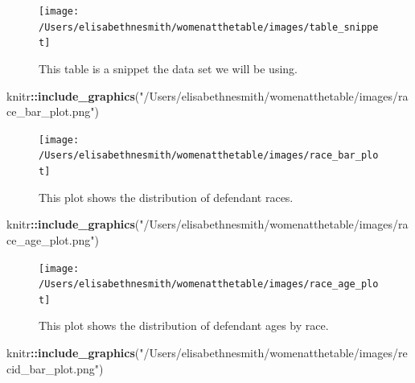 \documentclass[water,article,submit,moreauthors,pdftex]{mdpi}
\newenvironment{Shaded}{\begin{snugshade}}{\end{snugshade}}
\newcommand{\KeywordTok}[1]{\textcolor[rgb]{0.13,0.29,0.53}{\textbf{#1}}}
\newcommand{\NormalTok}[1]{#1}
\newcommand{\OperatorTok}[1]{\textcolor[rgb]{0.81,0.36,0.00}{\textbf{#1}}}
\newcommand{\StringTok}[1]{\textcolor[rgb]{0.31,0.60,0.02}{#1}}
\begin{document}
\begin{figure}

{\centering \texttt{[image: /Users/elisabethnesmith/womenatthetable/images/table\_snippet]} 

}

\caption{This table is a snippet the data set we will be using.}\label{fig:table snip}
\end{figure}

\begin{Shaded}
\begin{Highlighting}[]
\NormalTok{knitr}\OperatorTok{::}\KeywordTok{include_graphics}\NormalTok{(}\StringTok{"/Users/elisabethnesmith/womenatthetable/images/race_bar_plot.png"}\NormalTok{)}
\end{Highlighting}
\end{Shaded}

\begin{figure}

{\centering \texttt{[image: /Users/elisabethnesmith/womenatthetable/images/race\_bar\_plot]} 

}

\caption{This plot shows the distribution of defendant races.}\label{fig:race plot}
\end{figure}

\begin{Shaded}
\begin{Highlighting}[]
\NormalTok{knitr}\OperatorTok{::}\KeywordTok{include_graphics}\NormalTok{(}\StringTok{"/Users/elisabethnesmith/womenatthetable/images/race_age_plot.png"}\NormalTok{)}
\end{Highlighting}
\end{Shaded}

\begin{figure}

{\centering \texttt{[image: /Users/elisabethnesmith/womenatthetable/images/race\_age\_plot]} 

}

\caption{This plot shows the distribution of defendant ages by race.}\label{fig:age plot}
\end{figure}

\begin{Shaded}
\begin{Highlighting}[]
\NormalTok{knitr}\OperatorTok{::}\KeywordTok{include_graphics}\NormalTok{(}\StringTok{"/Users/elisabethnesmith/womenatthetable/images/recid_bar_plot.png"}\NormalTok{)}
\end{Highlighting}
\end{Shaded}
\end{document}

